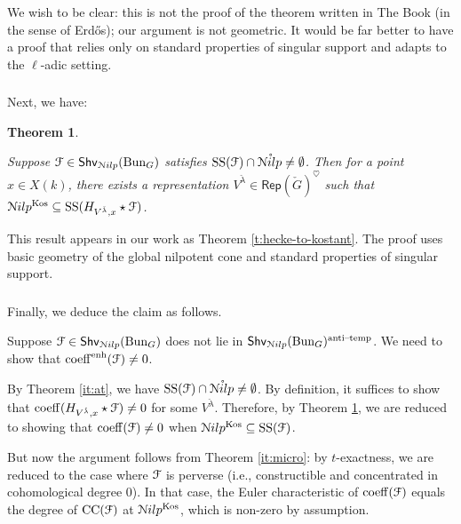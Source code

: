 \documentclass[reqno,11pt]{amsart}
\numberwithin{equation}{subsection}
\newtheorem{introthm}{Theorem}
\theoremstyle{remark}
\newcommand{\sF}{{\EuScript F}}
\newcommand{\sN}{{\EuScript N}}
\newcommand{\on}{\operatorname}
\newcommand{\mathendash}{\text{\textendash}}
\newcommand{\Rep}{\mathsf{Rep}}
\newcommand{\Bun}{\on{Bun}}
\newcommand{\heart}{\heartsuit}
\renewcommand{\o}[1]{\mathring{#1}}
\renewcommand{\subset}{\subseteq}
\newcommand{\coeff}{\on{coeff}}
\newcommand{\enh}{\on{enh}}
\newcommand{\Shv}{\mathsf{Shv}}
\newcommand{\at}{\on{anti}\!\mathendash\!\on{temp}}
\newcommand{\Nilp}{\sN ilp}
\newcommand{\Kos}{\on{Kos}}
\renewcommand{\SS}{\on{SS}}
\newcommand{\CC}{\on{CC}}
\begin{document}
We wish to be clear: this is not the proof of the theorem 
written in The Book (in the sense of Erd\H{o}s); our argument
is not geometric. It would be
far better to have a proof that relies only on standard
properties of singular support and adapts to the $\ell$-adic setting.

\subsubsection{}

Next, we have:

\begin{introthm}\label{it:trans}

Suppose $\sF\in \Shv_{\Nilp}(\Bun_G)$ satisfies 
$\SS(\sF) \cap \o{\Nilp} \neq \emptyset$. Then for a
point $x \in X(k)$, there exists a representation 
$V^{\check{\lambda}} \in \Rep(\check{G})^{\heart}$
such that $\Nilp^{\Kos} \subset \SS(H_{V^{\check{\lambda}},x} \star \sF)$.

\end{introthm}

This result appears in our work as Theorem \ref{t:hecke-to-kostant}. 
The proof uses basic geometry of the global nilpotent cone and standard
properties of singular support. 

\subsubsection{}

Finally, we deduce the claim as follows. 

Suppose $\sF\in \Shv_{\Nilp}(\Bun_G)$ does not lie
in $\Shv_{\Nilp}(\Bun_G)^{\at}$. We need to show that
$\coeff^{\enh}(\sF) \neq 0$. 

By Theorem \ref{it:at}, we have 
$\SS(\sF) \cap \o{\Nilp} \neq \emptyset$. 
By definition, it suffices to show that 
$\coeff(H_{V^{\check{\lambda}},x} \star \sF) \neq 0$
for some $V^{\check{\lambda}}$. Therefore, by Theorem \ref{it:trans},
we are reduced to showing that $\coeff(\sF) \neq 0$
when $\Nilp^{\Kos} \subset \SS(\sF)$.

But now the argument follows from Theorem \ref{it:micro}:
by $t$-exactness, we are reduced to the case where $\sF$ is
perverse (i.e., constructible and concentrated in cohomological degree $0$).
In that case,
the Euler characteristic of $\coeff(\sF)$ equals the degree of 
$\CC(\sF)$ at $\Nilp^{\Kos}$, which is non-zero by assumption.

\subsubsection{}
\end{document}
